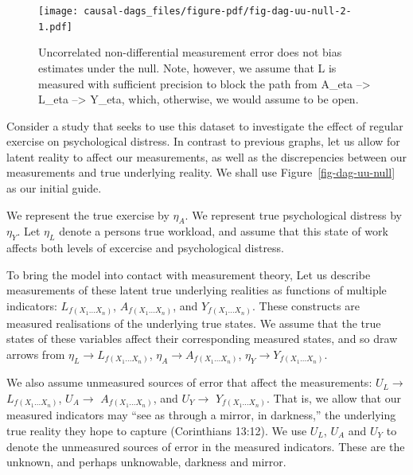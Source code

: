 \documentclass[
  singlecolumn]{report}
\begin{document}
\begin{figure}

{\centering \texttt{[image: causal-dags\_files/figure-pdf/fig-dag-uu-null-2-1.pdf]}

}

\caption{\label{fig-dag-uu-null-2}Uncorrelated non-differential
measurement error does not bias estimates under the null. Note, however,
we assume that L is measured with sufficient precision to block the path
from A\_eta --\textgreater{} L\_eta --\textgreater{} Y\_eta, which,
otherwise, we would assume to be open.}

\end{figure}

Consider a study that seeks to use this dataset to investigate the
effect of regular exercise on psychological distress. In contrast to
previous graphs, let us allow for latent reality to affect our
measurements, as well as the discrepencies between our measurements and
true underlying reality. We shall use Figure~\ref{fig-dag-uu-null} as
our initial guide.

We represent the true exercise by \(\eta_A\). We represent true
psychological distress by \(\eta_Y\). Let \(\eta_L\) denote a persons
true workload, and assume that this state of work affects both levels of
excercise and psychological distress.

To bring the model into contact with measurement theory, Let us describe
measurements of these latent true underlying realities as functions of
multiple indicators: \(L_{f(X_1\dots X_n)}\), \(A_{f(X_1\dots X_n)}\),
and \(Y_{f(X_1\dots X_n)}\). These constructs are measured realisations
of the underlying true states. We assume that the true states of these
variables affect their corresponding measured states, and so draw arrows
from \(\eta_L\rightarrow{L_{f(X_1\dots X_n)}}\),
\(\eta_A\rightarrow{A_{f(X_1\dots X_n)}}\),
\(\eta_Y\rightarrow{Y_{f(X_1\dots X_n)}}\).

We also assume unmeasured sources of error that affect the measurements:
\(U_{L} \rightarrow\) \(L_{f(X_1\dots X_n)}\), \(U_{A} \rightarrow\)
\(A_{f(X_1\dots X_n)}\), and \(U_{Y} \rightarrow\)
\(Y_{f(X_1\dots X_n)}\). That is, we allow that our measured indicators
may ``see as through a mirror, in darkness,'' the underlying true
reality they hope to capture (Corinthians 13:12). We use \(U_{L}\),
\(U_{A}\) and \(U_{Y}\) to denote the unmeasured sources of error in the
measured indicators. These are the unknown, and perhaps unknowable,
darkness and mirror.
\end{document}
